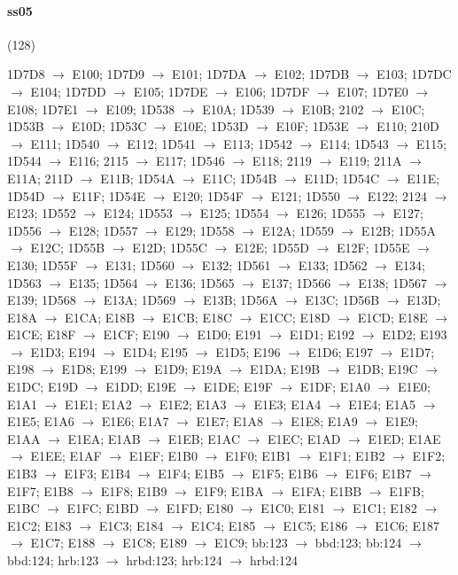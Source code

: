 \paragraph{ss05} (128)
\raggedright\small 1D7D8 $\to$ E100; 1D7D9 $\to$ E101; 1D7DA $\to$ E102; 1D7DB
$\to$ E103; 1D7DC $\to$ E104; 1D7DD $\to$ E105; 1D7DE $\to$ E106; 1D7DF $\to$
E107; 1D7E0 $\to$ E108; 1D7E1 $\to$ E109; 1D538 $\to$ E10A; 1D539 $\to$ E10B;
2102 $\to$ E10C; 1D53B $\to$ E10D; 1D53C $\to$ E10E; 1D53D $\to$ E10F; 1D53E
$\to$ E110; 210D $\to$ E111; 1D540 $\to$ E112; 1D541 $\to$ E113; 1D542 $\to$
E114; 1D543 $\to$ E115; 1D544 $\to$ E116; 2115 $\to$ E117; 1D546 $\to$ E118;
2119 $\to$ E119; 211A $\to$ E11A; 211D $\to$ E11B; 1D54A $\to$ E11C; 1D54B
$\to$ E11D; 1D54C $\to$ E11E; 1D54D $\to$ E11F; 1D54E $\to$ E120; 1D54F $\to$
E121; 1D550 $\to$ E122; 2124 $\to$ E123; 1D552 $\to$ E124; 1D553 $\to$ E125;
1D554 $\to$ E126; 1D555 $\to$ E127; 1D556 $\to$ E128; 1D557 $\to$ E129; 1D558
$\to$ E12A; 1D559 $\to$ E12B; 1D55A $\to$ E12C; 1D55B $\to$ E12D; 1D55C $\to$
E12E; 1D55D $\to$ E12F; 1D55E $\to$ E130; 1D55F $\to$ E131; 1D560 $\to$ E132;
1D561 $\to$ E133; 1D562 $\to$ E134; 1D563 $\to$ E135; 1D564 $\to$ E136; 1D565
$\to$ E137; 1D566 $\to$ E138; 1D567 $\to$ E139; 1D568 $\to$ E13A; 1D569 $\to$
E13B; 1D56A $\to$ E13C; 1D56B $\to$ E13D; E18A $\to$ E1CA; E18B $\to$ E1CB;
E18C $\to$ E1CC; E18D $\to$ E1CD; E18E $\to$ E1CE; E18F $\to$ E1CF; E190 $\to$
E1D0; E191 $\to$ E1D1; E192 $\to$ E1D2; E193 $\to$ E1D3; E194 $\to$ E1D4; E195
$\to$ E1D5; E196 $\to$ E1D6; E197 $\to$ E1D7; E198 $\to$ E1D8; E199 $\to$ E1D9;
E19A $\to$ E1DA; E19B $\to$ E1DB; E19C $\to$ E1DC; E19D $\to$ E1DD; E19E $\to$
E1DE; E19F $\to$ E1DF; E1A0 $\to$ E1E0; E1A1 $\to$ E1E1; E1A2 $\to$ E1E2; E1A3
$\to$ E1E3; E1A4 $\to$ E1E4; E1A5 $\to$ E1E5; E1A6 $\to$ E1E6; E1A7 $\to$ E1E7;
E1A8 $\to$ E1E8; E1A9 $\to$ E1E9; E1AA $\to$ E1EA; E1AB $\to$ E1EB; E1AC $\to$
E1EC; E1AD $\to$ E1ED; E1AE $\to$ E1EE; E1AF $\to$ E1EF; E1B0 $\to$ E1F0; E1B1
$\to$ E1F1; E1B2 $\to$ E1F2; E1B3 $\to$ E1F3; E1B4 $\to$ E1F4; E1B5 $\to$ E1F5;
E1B6 $\to$ E1F6; E1B7 $\to$ E1F7; E1B8 $\to$ E1F8; E1B9 $\to$ E1F9; E1BA $\to$
E1FA; E1BB $\to$ E1FB; E1BC $\to$ E1FC; E1BD $\to$ E1FD; E180 $\to$ E1C0; E181
$\to$ E1C1; E182 $\to$ E1C2; E183 $\to$ E1C3; E184 $\to$ E1C4; E185 $\to$ E1C5;
E186 $\to$ E1C6; E187 $\to$ E1C7; E188 $\to$ E1C8; E189 $\to$ E1C9; bb:123
$\to$ bbd:123; bb:124 $\to$ bbd:124; hrb:123 $\to$ hrbd:123; hrb:124 $\to$
hrbd:124\par

